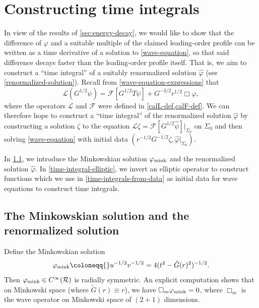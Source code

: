 \documentclass[10pt, reqno]{amsart}
\begin{document}
\section{Constructing time integrals}
\label{sec:time-integrals}
In view of the results of \cref{sec:energy-decay}, we would like to show that the
difference of \(\varphi{}\) and a suitable multiple of the claimed leading-order
profile can be written as a time derivative of a solution to \cref{wave-equation},
so that said difference decays faster than the leading-order profile itself.
That is, we aim to construct a ``time integral'' of a suitably renormalized
solution \(\widehat{\varphi{}}\) (see \cref{renormalized-solution}). Recall from \cref{wave-equation-expressions} that
\begin{equation}
\mathcal{L}(G^{1/2}\psi{}) = \mathcal{F}[G^{1/2}T\psi{}] + G^{-3/2}r^{1/2}\Box{}\varphi{},
\end{equation}
where the operators \(\mathcal{L}\) and \(\mathcal{F}\) were defined in
\cref{calL-def,calF-def}. We can therefore hope to construct a ``time integral'' of
the renormalized solution \(\widehat{\varphi{}}\) by constructing a solution \(\zeta{}\) to
the equation \(\mathcal{L}\zeta{} =
\mathcal{F}[G^{1/2}\widehat{\psi{}}]|_{\Sigma{}_0}\) on \(\Sigma_0\) and then
solving \cref{wave-equation} with initial data
\((r^{-1/2}G^{-1/2}\zeta{},\widehat{\varphi{}}|_{\Sigma{}_0})\).

In \cref{minkowskian-soln}, we introduce the Minkowskian solution
\(\varphi{}_{\textnormal{mink}}\) and the renormalized solution \(\widehat{\varphi{}}\). In
\cref{time-integral-elliptic}, we invert an elliptic operator to construct
functions which we use in \cref{time-integrals-from-data} as initial data for wave
equations to construct time integrals.
\subsection{The Minkowskian solution and the renormalized solution}
\label{minkowskian-soln}
Define the Minkowskian solution
\begin{equation}
\varphi{}_{\textnormal{mink}} \coloneqq{} u^{-1/2}v^{-1/2} = 4(t^2-\tilde{G}(r)^2)^{-1/2}.
\end{equation}
Then \(\varphi_{\textnormal{mink}}\in C^\infty(\mathcal{R})\) is radially symmetric. An explicit computation
shows that on Minkowski space (where \(\tilde{G}(r)\equiv r\)), we have
\(\Box{}_{m}\varphi{}_{\textnormal{mink}} = 0\), where
\(\Box_{m}\) is the wave operator on Minkowski space of \((2 + 1)\)
dimensions.
\end{document}
